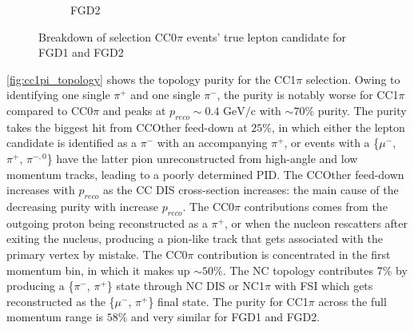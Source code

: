 \begin{figure}[h]
\begin{subfigure}[t]{0.49\textwidth}
		\caption{FGD2}
	\end{subfigure}
	\caption{Breakdown of selection CC0$\pi$ events' true lepton candidate for FGD1 and FGD2 }
	\label{fig:cc0pi_muon}
\end{figure}

\autoref{fig:cc1pi_topology} shows the topology purity for the CC1$\pi$ selection. Owing to identifying one single $\pi^+$ and one single $\pi^-$, the purity is notably worse for CC1$\pi$ compared to CC0$\pi$ and peaks at $p_{reco}\sim0.4\text{ GeV/c}$ with $\sim70\%$ purity. The purity takes the biggest hit from CCOther feed-down at $25\%$, in which either the lepton candidate is identified as a $\pi^-$ with an accompanying $\pi^+$, or events with a \{$\mu^-$, $\pi^+$, $\pi^{-,0}$\} have the latter pion unreconstructed from high-angle and low momentum tracks, leading to a poorly determined PID. The CCOther feed-down increases with $p_{reco}$ as the CC DIS cross-section increases: the main cause of the decreasing purity with increase $p_{reco}$. The CC0$\pi$ contributions comes from the outgoing proton being reconstructed as a $\pi^+$, or when the nucleon rescatters after exiting the nucleus, producing a pion-like track that gets associated with the primary vertex by mistake. The CC0$\pi$ contribution is concentrated in the first momentum bin, in which it makes up $\sim50\%$. The NC topology contributes 7\% by producing a \{$\pi^-$, $\pi^+$\} state through NC DIS or NC1$\pi$ with FSI which gets reconstructed as the \{$\mu^-$, $\pi^+$\} final state. The purity for CC1$\pi$ across the full momentum range is $58\%$ and very similar for FGD1 and FGD2.

